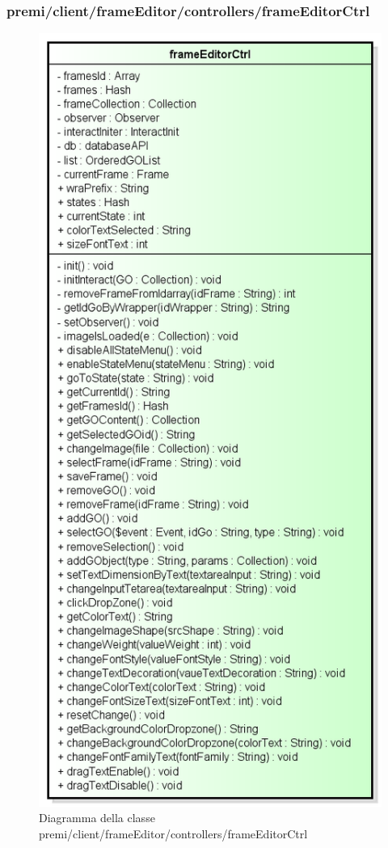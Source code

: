 \subsubsection{premi/client/frameEditor/controllers/frameEditorCtrl}
\begin{figure}[H]
\begin{center}
\includegraphics[scale=0.47]{img/diacla/frameEditorCtrl.png}
\caption{Diagramma della classe premi/client/frameEditor/controllers/frameEditorCtrl}
\end{center}
\end{figure}


